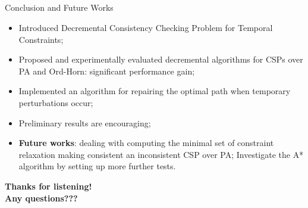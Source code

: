 \documentclass[utf8, a4paper]{beamer}
\begin{document}
\subsection{}
\begin{frame}{Conclusion and Future Works}
	\begin{itemize}
		\item Introduced Decremental Consistency Checking Problem for Temporal Constraints;
		\item Proposed and experimentally evaluated decremental algorithms for CSPs over PA and Ord-Horn: significant performance gain;
		\item Implemented an algorithm for repairing the optimal path when temporary perturbations occur;
		\item Preliminary results are encouraging;
		\item \textbf{Future works}: dealing with computing the minimal set of constraint relaxation making consistent an inconsistent CSP over PA; Investigate the A* algorithm by setting up more further tests.
	\end{itemize}
\end{frame}



\usebackgroundtemplate{%
	\texttt{[image: 403]}%
}
\begin{frame}[plain]
\centering \Huge \textbf{Thanks for listening!\\Any questions???}
\end{frame}
\end{document}

